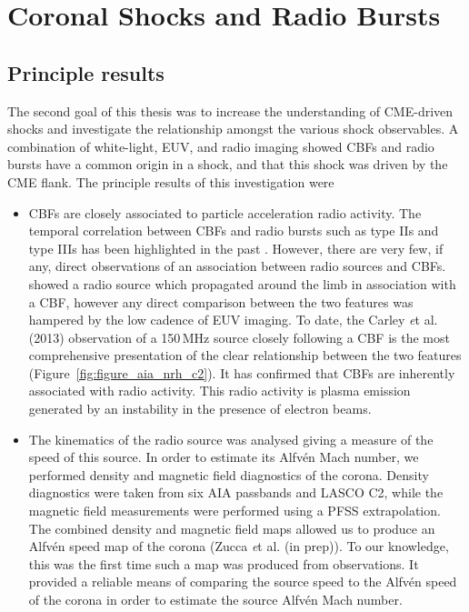 \section{Coronal Shocks and Radio Bursts}

\subsection{Principle results}
The second goal of this thesis was to increase the understanding of CME-driven shocks and investigate the relationship amongst the various shock observables. A combination of white-light, EUV, and radio imaging showed CBFs and radio bursts have a common origin in a shock, and that this shock was driven by the CME flank. The principle results of this investigation were
\begin{itemize}
\item CBFs are closely associated to particle acceleration radio activity. The temporal correlation between CBFs and radio bursts such as type IIs and type IIIs has been highlighted in the past \citep{klassen2000, maia2004}. However, there are very few, if any, direct observations of an association between radio sources and CBFs. \citet{vrsnak2005a} showed a radio source which propagated around the limb in association with a CBF, however any direct comparison between the two features was hampered by the low cadence of EUV imaging. To date, the Carley {\emph et al.} (2013) observation of a 150\,MHz source closely following a CBF is the most comprehensive presentation of the clear relationship between the two features (Figure~\ref{fig:figure_aia_nrh_c2}). It has confirmed that CBFs are inherently associated with radio activity. This radio activity is plasma emission generated by an instability in the presence of electron beams.
\item The kinematics of the radio source was analysed giving a measure of the speed of this source. In order to estimate its Alfv\'{e}n Mach number, we performed density and magnetic field diagnostics of the corona. Density diagnostics were taken from six AIA passbands and LASCO C2, while the magnetic field measurements were performed using a PFSS extrapolation. The combined density and magnetic field maps allowed us to produce an Alfv\'{e}n speed map of the corona (Zucca {\emph et al.} (in prep)). To our knowledge, this was the first time such a map was produced from observations. It provided a reliable means of comparing the source speed to the Alfv\'{e}n speed of the corona in order to estimate the source Alfv\'{e}n Mach number.

\end{itemize}
